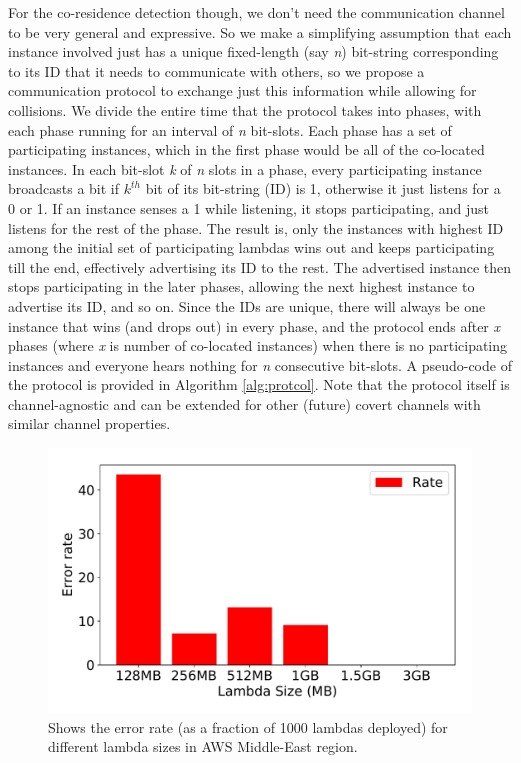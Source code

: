 For the co-residence detection though, we don't need the communication channel
to be very general and expressive. So we make a simplifying assumption that each
instance involved just has a unique fixed-length (say \emph{n}) bit-string
corresponding to its ID that it needs to communicate with others, so we propose
a communication protocol to exchange just this information while allowing for
collisions. We divide the entire time that the protocol takes into phases, with
each phase running for an interval of \textit{n} bit-slots. Each phase has a set
of participating instances, which in the first phase would be all of the
co-located instances. In each bit-slot \textit{k} of \textit{n} slots in a
phase, every participating instance broadcasts a bit if $k^{th}$ bit of its
bit-string (ID) is 1, otherwise it just listens for a 0 or 1. If an instance
senses a 1 while listening, it stops participating, and just listens for the
rest of the phase. The result is, only the instances with highest ID among the
initial set of participating lambdas wins out and keeps participating till the
end, effectively advertising its ID to the rest. The advertised instance then
stops participating in the later phases, allowing the next highest instance to
advertise its ID, and so on. Since the IDs are unique, there will always be one
instance that wins (and drops out) in every phase, and the protocol ends after
\textit{x} phases (where \textit{x} is number of co-located instances) when
there is no participating instances and everyone hears nothing for \textit{n}
consecutive bit-slots. A pseudo-code of the protocol is provided in Algorithm
\ref{alg:protcol}. Note that the protocol itself is channel-agnostic and can be
extended for other (future) covert channels with similar channel properties.

\begin{figure}[!t]
  \includegraphics[width=.99\linewidth]{fig/errorrates.pdf}
  \caption{Shows the error rate (as a fraction of 1000 lambdas deployed) for different lambda sizes in AWS Middle-East region. 
\label{fig:errorrates}}
\end{figure}

